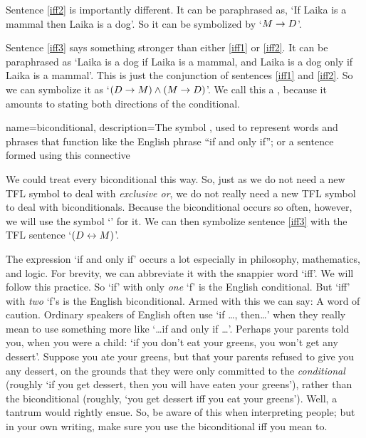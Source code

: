 Sentence \ref{iff2} is importantly different. It can be paraphrased as, `If Laika is a mammal then Laika is a dog'. So it can be symbolized by `$M \rightarrow D$'.

Sentence \ref{iff3} says something stronger than either \ref{iff1} or \ref{iff2}. It can be paraphrased as `Laika is a dog if Laika is a mammal, and Laika is a dog only if Laika is a mammal'. This is just the conjunction of sentences \ref{iff1} and \ref{iff2}. So we can symbolize it as `$(D \rightarrow M) \wedge (M \rightarrow D)$'. We call this a , because it amounts to stating both directions of the conditional.

{
name=biconditional,
description={The symbol \eiff, used to represent words and phrases that function like the English phrase ``if and only if''; or a sentence formed using this connective}
}

We could treat every biconditional this way. So, just as we do not need a new TFL symbol to deal with \emph{exclusive or}, we do not really need a new TFL symbol to deal with biconditionals. Because the biconditional occurs so often, however, we will use the symbol `\eiff' for it. We can then symbolize sentence \ref{iff3} with the TFL sentence `$(D \leftrightarrow M)$'.

The expression `if and only if' occurs a lot especially in philosophy, mathematics, and logic. For brevity, we can abbreviate it with the snappier word `iff'. We will follow this practice. So `if' with only \emph{one} `f' is the English conditional. But `iff' with \emph{two} `f's is the English biconditional. Armed with this we can say:
A word of caution. Ordinary speakers of English often use `if \ldots, then\ldots' when they really mean to use something more like `\ldots if and only if \ldots'. Perhaps your parents told you, when you were a child: `if you don't eat your greens, you won't get any dessert'. Suppose you ate your greens, but that your parents refused to give you any dessert, on the grounds that they were only committed to the \emph{conditional} (roughly `if you get dessert, then you will have eaten your greens'), rather than the biconditional (roughly, `you get dessert iff you eat your greens'). Well, a tantrum would rightly ensue. So, be aware of this when interpreting people; but in your own writing, make sure you use the biconditional iff you mean to.

